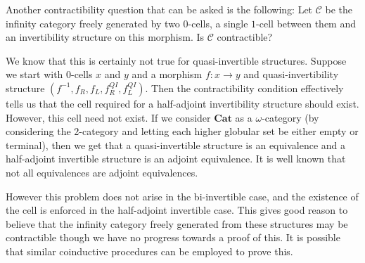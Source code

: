 \documentclass{article}
\newcommand{\inv}[1]{#1^{-1}} \newcommand{\comp}{\star}
\begin{document}
Another contractibility question that can be asked is the following:
Let \(\mathcal{C}\) be the infinity category freely generated by two
\(0\)-cells, a single \(1\)-cell between them and an invertibility
structure on this morphism. Is \(\mathcal{C}\) contractible?

We know that this is certainly not true for quasi-invertible
structures. Suppose we start with \(0\)-cells \(x\) and \(y\) and a
morphism \(f : x \to y\) and quasi-invertibility structure \((\inv f,
f_R, f_L, f_R^{QI}, f_L^{QI})\). Then the contractibility condition
effectively tells us that the cell required for a half-adjoint
invertibility structure should exist. However, this cell need not exist.
If we consider \(\mathbf{Cat}\) as a \(\omega\)-category (by
considering the 2-category and letting each higher globular set be either
empty or terminal), then we get that a quasi-invertible structure is
an equivalence and a half-adjoint invertible structure is an adjoint
equivalence. It is well known that not all equivalences are adjoint
equivalences.

However this problem does not arise in the bi-invertible case, and the
existence of the cell is enforced in the half-adjoint invertible case.
This gives good reason to believe that the infinity category freely
generated from these structures may be contractible though we have no
progress towards a proof of this. It is possible that similar
coinductive procedures can be employed to prove this.



\printbibliography{}
\end{document}
